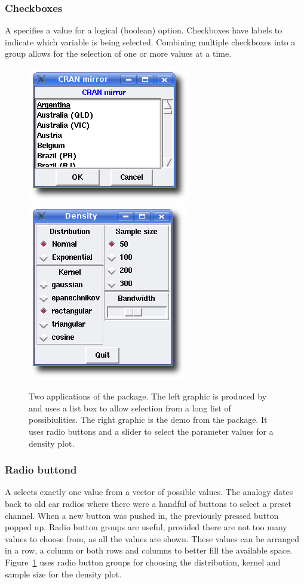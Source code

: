 \subsubsection{Checkboxes}
\label{sec:GUI:checkboxes}

A  specifies a value for a logical
(boolean) option. Checkboxes have labels to indicate which variable is
being selected. Combining multiple checkboxes into a group allows for
the selection of one or more values at a time.

\begin{figure}
  \centering
  \includegraphics[width=.35\textwidth]{ex-listbox}
  \includegraphics[width=.35\textwidth]{tcltk-tkdensity}
  \caption{
    Two applications of the  package. 
    The left graphic is
    produced by  and uses a list box to
    allow selection from a long list of possibiulities.
    The right graphic is the  demo from the
    package. It uses radio buttons and a slider to select the
    parameter values for a density plot.
  }
  \label{fig:GUI:ex-tcltk}
\end{figure}

\subsubsection{Radio buttond}
\label{sec:GUI:radio=button-groups}

A  selects exactly one value from a vector of
possible values. The analogy dates back to old car radios where there
were a handful of buttons to select a preset channel. When a new
button was pushed in, the previously pressed button popped up.  Radio
button groups are useful, provided there are not too many values to
choose from, as all the values are shown. These values can be arranged
in a row, a column or both rows and columns to better fill the
available space. Figure~\ref{fig:GUI:ex-tcltk} uses radio button
groups for choosing the distribution, kernel and sample size for the
density plot.

